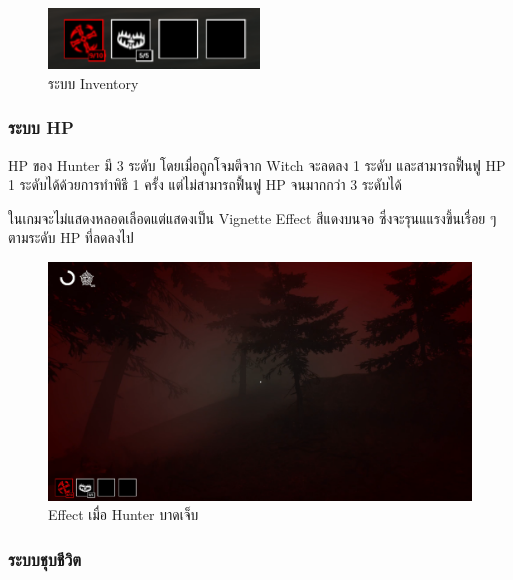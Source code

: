 \begin{figure}[h]
  \begin{center}
  \includegraphics[width=0.5\textwidth]{./img/mechanics/inventory.png}
  \end{center}
  \caption[ระบบ Inventory]{ระบบ Inventory}
  \label{ระบบ Inventory}
\end{figure}

\subsubsection{ระบบ HP}

HP ของ Hunter มี 3 ระดับ โดยเมื่อถูกโจมตีจาก Witch จะลดลง 1 ระดับ และสามารถฟื้นฟู HP 1 ระดับได้ด้วยการทำพิธี 
1 ครั้ง แต่ไม่สามารถฟื้นฟู HP จนมากกว่า 3 ระดับได้

ในเกมจะไม่แสดงหลอดเลือดแต่แสดงเป็น Vignette Effect สีแดงบนจอ ซึ่งจะรุนแแรงขึ้นเรื่อย ๆ ตามระดับ HP ที่ลดลงไป

\begin{figure}[p]
  \begin{center}
  \includegraphics[width=\textwidth]{./img/mechanics/damage_effect.png}
  \end{center}
  \caption[Effect เมื่อ Hunter บาดเจ็บ]{Effect เมื่อ Hunter บาดเจ็บ}
  \label{Effect เมื่อบาดเจ็บ}
\end{figure}

\subsubsection{ระบบชุบชีวิต}

